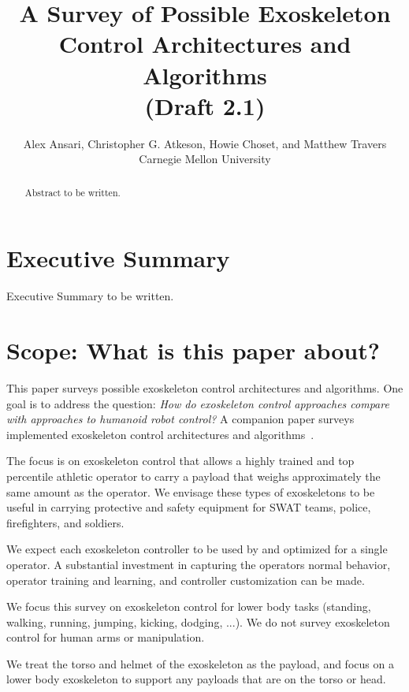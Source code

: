 \documentclass[letterpaper,12pt,fullpage]{article}
\begin{document}
\title{A Survey of Possible Exoskeleton Control Architectures and
Algorithms\\
(Draft 2.1)}

\author{Alex Ansari, Christopher G. Atkeson, Howie Choset, and Matthew Travers\\
Carnegie Mellon University}

\maketitle

\begin{abstract}
Abstract to be written.
\end{abstract}

\section{Executive Summary}

Executive Summary to be written.

\section{Scope: What is this paper about?}

This paper surveys possible exoskeleton control architectures and
algorithms.
One goal is to address the question:
{\it How do exoskeleton control approaches compare with 
approaches to humanoid robot control?}
A companion paper surveys implemented exoskeleton control architectures
and algorithms~\cite{}.

The focus is on exoskeleton control that allows a
highly trained and top percentile athletic 
operator to carry a payload that weighs approximately the same amount
as the operator. We envisage these types of exoskeletons to be useful
in carrying protective and safety equipment for SWAT teams, police,
firefighters, and soldiers. 

We expect each exoskeleton controller
to be used by and optimized for a single operator.
A substantial investment in capturing the operators normal behavior,
operator training and learning, and controller customization can be made.

We focus this survey on exoskeleton control for lower body tasks (standing, walking,
running, jumping, kicking, dodging, ...).
We do not survey exoskeleton control for human arms or manipulation. 

We treat the torso and helmet of the exoskeleton as the payload,
and focus on a lower body exoskeleton to support any payloads that
are on the torso or head.
\end{document}
